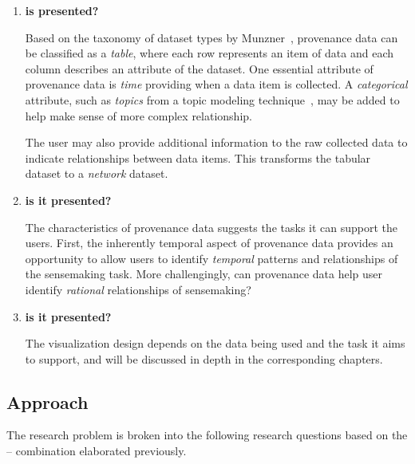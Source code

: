 \begin{enumerate}
	\item \textbf{ is presented?}
	
	Based on the taxonomy of dataset types by Munzner~\cite{Munzner2014}, provenance data can be classified as a \emph{table}, where each row represents an item of data and each column describes an attribute of the dataset. One essential attribute of provenance data is \emph{time} providing when a data item is collected. A \emph{categorical} attribute, such as \emph{topics} from a topic modeling technique~\cite{Blei2003}, may be added to help make sense of more complex relationship.
	
	The user may also provide additional information to the raw collected data to indicate relationships between data items. This transforms the tabular dataset to a \emph{network} dataset.
	
	\item \textbf{ is it presented?}
	
	The characteristics of provenance data suggests the tasks it can support the users. First, the inherently temporal aspect of provenance data provides an opportunity to allow users to identify \emph{temporal} patterns and relationships of the sensemaking task. More challengingly, can provenance data help user identify \emph{rational} relationships of sensemaking?
	
	\item \textbf{ is it presented?}
	
	The visualization design depends on the data being used and the task it aims to support, and will be discussed in depth in the corresponding chapters.
\end{enumerate}

\subsection{Approach}

The research problem is broken into the following research questions based on the \emph{}--\emph{} combination elaborated previously.

